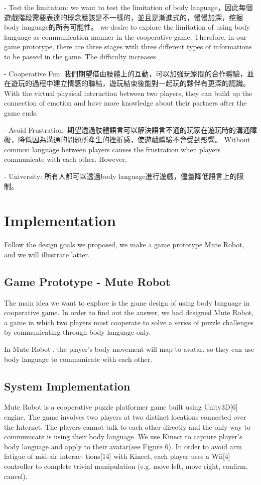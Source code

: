 \documentclass{sigchi}
\begin{document}
- Test the limitation: we want to test the limitation of body language，因此每個遊戲階段需要表達的概念應該是不一樣的，並且是漸進式的，慢慢加深，挖掘body language的所有可能性。
  we desire to explore the limitation of using body language as communication manner in the cooperative game. Therefore, in our game prototype, there are three stages with three different types of informations to be passed in the game. The difficulty increases 

- Cooperative Fun: 我們期望借由肢體上的互動，可以加強玩家間的合作體驗，並在遊玩的過程中建立情感的聯結，遊玩結束後能對一起玩的夥伴有更深的認識。
  With the virtual physical interaction between two players, they can build up the connection of emotion and have more knowledge about their partners after the game ends. 

- Avoid Frustration: 期望透過肢體語言可以解決語言不通的玩家在遊玩時的溝通障礙，降低因為溝通的問題所產生的挫折感，使遊戲體驗不會受到影響。
Without common language between players causes the frustration when players communicate with each other. However, 

- University: 所有人都可以透過body language進行遊戲，儘量降低語言上的限制。

\section{Implementation}

Follow the design goals we proposed, we make a game prototype Mute Robot, and we will illustrate latter.

\subsection{Game Prototype - Mute Robot}

The main idea we want to explore is the game design of using body language in cooperative game. In order to find out the answer, we had designed Mute Robot, a game in which two players must cooperate to solve a series of puzzle challenges by communicating through body language only.
          
In Mute Robot , the player’s body movement will map to avatar, so they can use body language to communicate with each other.

\subsection{System Implementation}

Mute Robot is a cooperative puzzle platformer game built using Unity3D[6] engine. The game involves two players at two distinct locations connected over the Internet. The players cannot talk to each other directly and the only way to communicate is using their body language. We use Kinect to capture player’s body language and apply to their avatar(see Figure 6). In order to avoid arm fatigue of mid-air interac- tions[14] with Kinect, each player uses a Wii[4] controller to complete trivial manipulation (e.g. move left, move right, confirm, cancel).  
\end{document}
